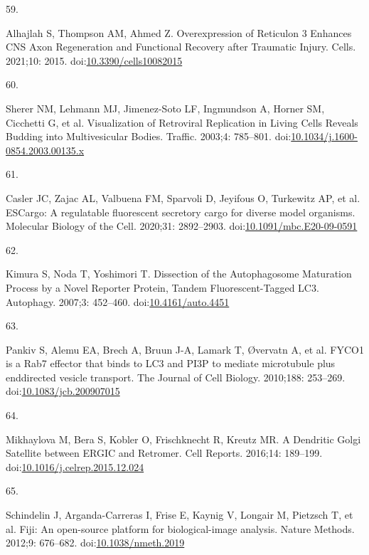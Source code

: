 \documentclass[
  12pt,
  a4paper,
]{book}
\newlength{\cslhangindent}
\newlength{\csllabelwidth}
\newlength{\cslentryspacingunit} %
\newenvironment{CSLReferences}[2] %
 {%
  \setlength{\parindent}{0pt}
  \ifodd #1
  \let\oldpar\par
  \def\par{\hangindent=\cslhangindent\oldpar}
  \fi
  \setlength{\parskip}{#2\cslentryspacingunit}
 }%
 {}
\newcommand{\CSLLeftMargin}[1]{\parbox[t]{\csllabelwidth}{#1}}
\newcommand{\CSLRightInline}[1]{\parbox[t]{\linewidth - \csllabelwidth}{#1}\break}
\begin{document}
\begin{CSLReferences}{0}{0}
\leavevmode{}%
\CSLLeftMargin{59. }%
\CSLRightInline{Alhajlah S, Thompson AM, Ahmed Z. Overexpression of {Reticulon} 3 {Enhances CNS Axon Regeneration} and {Functional Recovery} after {Traumatic Injury}. Cells. 2021;10: 2015. doi:\href{https://doi.org/10.3390/cells10082015}{10.3390/cells10082015}}

\leavevmode{}%
\CSLLeftMargin{60. }%
\CSLRightInline{Sherer NM, Lehmann MJ, Jimenez-Soto LF, Ingmundson A, Horner SM, Cicchetti G, et al. Visualization of {Retroviral Replication} in {Living Cells Reveals Budding} into {Multivesicular Bodies}. Traffic. 2003;4: 785--801. doi:\href{https://doi.org/10.1034/j.1600-0854.2003.00135.x}{10.1034/j.1600-0854.2003.00135.x}}

\leavevmode{}%
\CSLLeftMargin{61. }%
\CSLRightInline{Casler JC, Zajac AL, Valbuena FM, Sparvoli D, Jeyifous O, Turkewitz AP, et al. {ESCargo}: A regulatable fluorescent secretory cargo for diverse model organisms. Molecular Biology of the Cell. 2020;31: 2892--2903. doi:\href{https://doi.org/10.1091/mbc.E20-09-0591}{10.1091/mbc.E20-09-0591}}

\leavevmode{}%
\CSLLeftMargin{62. }%
\CSLRightInline{Kimura S, Noda T, Yoshimori T. Dissection of the {Autophagosome Maturation Process} by a {Novel Reporter Protein}, {Tandem Fluorescent-Tagged LC3}. Autophagy. 2007;3: 452--460. doi:\href{https://doi.org/10.4161/auto.4451}{10.4161/auto.4451}}

\leavevmode{}%
\CSLLeftMargin{63. }%
\CSLRightInline{Pankiv S, Alemu EA, Brech A, Bruun J-A, Lamark T, Øvervatn A, et al. {FYCO1} is a {Rab7} effector that binds to {LC3} and {PI3P} to mediate microtubule plus end\textendash directed vesicle transport. The Journal of Cell Biology. 2010;188: 253--269. doi:\href{https://doi.org/10.1083/jcb.200907015}{10.1083/jcb.200907015}}

\leavevmode{}%
\CSLLeftMargin{64. }%
\CSLRightInline{Mikhaylova M, Bera S, Kobler O, Frischknecht R, Kreutz MR. A {Dendritic Golgi Satellite} between {ERGIC} and {Retromer}. Cell Reports. 2016;14: 189--199. doi:\href{https://doi.org/10.1016/j.celrep.2015.12.024}{10.1016/j.celrep.2015.12.024}}

\leavevmode{}%
\CSLLeftMargin{65. }%
\CSLRightInline{Schindelin J, Arganda-Carreras I, Frise E, Kaynig V, Longair M, Pietzsch T, et al. Fiji: An open-source platform for biological-image analysis. Nature Methods. 2012;9: 676--682. doi:\href{https://doi.org/10.1038/nmeth.2019}{10.1038/nmeth.2019}}


\end{CSLReferences}
\end{document}
